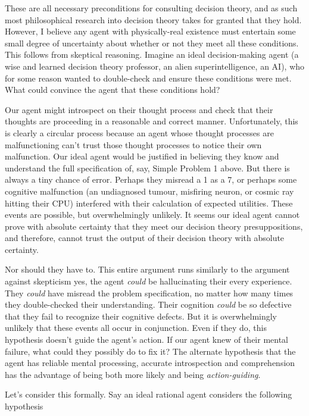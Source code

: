 \documentclass{article}
\begin{document}
These are all necessary preconditions for consulting decision theory, and as such most philosophical research into decision theory takes for granted that they hold. However, I believe any agent with physically-real existence must entertain some small degree of uncertainty about whether or not they meet all these conditions. This follows from skeptical reasoning. Imagine an ideal decision-making agent (a wise and learned decision theory professor, an alien superintelligence, an AI), who for some reason wanted to double-check and ensure these conditions were met. What could convince the agent that these conditions hold?

Our agent might introspect on their thought process and check that their thoughts are proceeding in a reasonable and correct manner. Unfortunately, this is clearly a circular process because an agent whose thought processes are malfunctioning can't trust those thought processes to notice their own malfunction. Our ideal agent would be justified in believing they know and understand the full specification of, say, Simple Problem 1 above. But there is always a tiny chance of error. Perhaps they misread a 1 as a 7, or perhaps some cognitive malfunction (an undiagnosed tumour, misfiring neuron, or cosmic ray hitting their CPU) interfered with their calculation of expected utilities. These events are possible, but overwhelmingly unlikely. It seems our ideal agent cannot prove with absolute certainty that they meet our decision theory presuppositions, and therefore, cannot trust the output of their decision theory with absolute certainty.

Nor should they have to. This entire argument runs similarly to the argument against skepticism \textemdash{} yes, the agent \textit{could} be hallucinating their every experience. They \textit{could} have misread the problem specification, no matter how many times they double-checked their understanding. Their cognition \textit{could} be so defective that they fail to recognize their cognitive defects. But it is overwhelmingly unlikely that these events all occur in conjunction. Even if they do, this hypothesis doesn't guide the agent's action. If our agent knew of their mental failure, what could they possibly do to fix it? The alternate hypothesis \textemdash{} that the agent has reliable mental processing, accurate introspection and comprehension \textemdash{} has the advantage of being both more likely and being \textit{action-guiding}. 

Let's consider this formally. Say an ideal rational agent considers the following hypothesis
\end{document}
